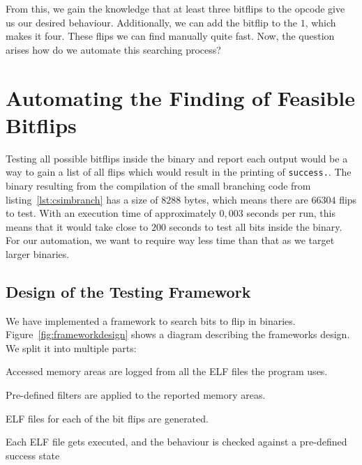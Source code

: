 From this, we gain the knowledge that at least three bitflips to the opcode give
us our desired behaviour. Additionally, we can add the bitflip to the $1$, which
makes it four. These flips we can find manually quite fast. Now, the question
arises how do we automate this searching process?

\section{Automating the Finding of Feasible Bitflips}

Testing all possible bitflips inside the binary and report each output would be
a way to gain a list of all flips which would result in the printing of
\texttt{success.}. The binary resulting from the compilation of the small
branching code from listing~\ref{lst:csimbranch} has a size of $8288$ bytes,
which means there are $66304$ flips to test. With an execution time of
approximately $0,003$ seconds per run, this means that it would take close to
$200$ seconds to test all bits inside the binary. For our automation, we want
to require way less time than that as we target larger binaries.

\subsection{Design of the Testing Framework}

We have implemented a framework to search bits to flip in binaries.
Figure~\ref{fig:frameworkdesign} shows a diagram describing the
framework\textquotesingle s design. We split it into multiple parts:

\begin{enumerate}
\begin{samepage}
  \item Accessed memory areas are logged from all the ELF files the program
uses.
  \item Pre-defined filters are applied to the reported memory areas.
  \item ELF files for each of the bit flips are generated.
  \item Each ELF file gets executed, and the behaviour is checked against a
pre-defined success state
\end{samepage}
\end{enumerate}

